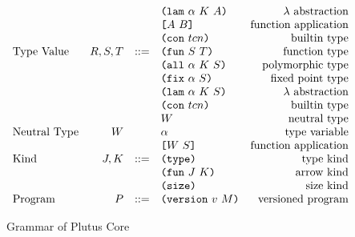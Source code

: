 \documentclass[../main.tex]{subfiles}
\begin{document}
\begin{figure*}[t]
\[\begin{array}{lrclr}
                                  &        &     & \texttt{(} \texttt{lam} ~ \alpha ~ K ~ A \texttt{)}        & \textrm{$\lambda$ abstraction}\\
                                  &        &     & \texttt{[} A ~ B \texttt{]}                & \textrm{function application}\\
                                  &        &     & \texttt{(} \texttt{con} ~ tcn \texttt{)}                  & \textrm{builtin type}\\
        \textrm{Type Value}       & R,S,T  & ::= & \texttt{(} \texttt{fun} ~ S ~ T \texttt{)}                & \textrm{function type}\\
                                  &        &     & \texttt{(} \texttt{all} ~ \alpha ~ K ~ S \texttt{)}        & \textrm{polymorphic type}\\
                                  &        &     & \texttt{(} \texttt{fix} ~ \alpha ~ S \texttt{)}           & \textrm{fixed point type}\\
                                  &        &     & \texttt{(} \texttt{lam} ~ \alpha ~ K ~ S \texttt{)}        & \textrm{$\lambda$ abstraction}\\
                                  &        &     & \texttt{(} \texttt{con} ~ tcn \texttt{)}                  & \textrm{builtin type}\\
                                  &        &     & W                          & \textrm{neutral type}\\
        \textrm{Neutral Type}     & W      &     & \alpha                     & \textrm{type variable}\\
                                  &        &     & \texttt{[} W ~ S \texttt{]}                & \textrm{function application}\\
        \textrm{Kind}             & J,K    & ::= & \texttt{(} \texttt{type} \texttt{)}{}                   & \textrm{type kind}\\
                                  &        &     & \texttt{(} \texttt{fun} ~ J ~ K \texttt{)}                & \textrm{arrow kind}\\
                                  &        &     & \texttt{(} \texttt{size} \texttt{)}{}                   & \textrm{size kind}\\
        \textrm{Program}          & P      & ::= & \texttt{(} \texttt{version} ~ v ~ M \texttt{)}             & \textrm{versioned program}\\

    \end{array}\]
    \caption{Grammar of Plutus Core}
    \label{fig:Plutus_core_grammar}
\end{figure*}
\end{document}
